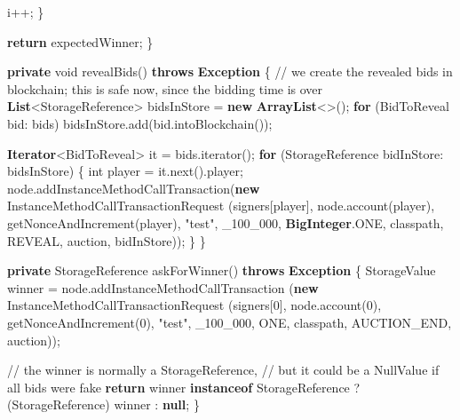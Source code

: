 \documentclass[a4paper,]{book}
\newenvironment{Shaded}{\begin{snugshade}}{\end{snugshade}}
\newcommand{\BuiltInTok}[1]{\textcolor[rgb]{0.39,0.29,0.61}{\textbf{#1}}}
\newcommand{\CommentTok}[1]{\textcolor[rgb]{0.54,0.53,0.53}{#1}}
\newcommand{\DataTypeTok}[1]{\textcolor[rgb]{0.00,0.34,0.68}{#1}}
\newcommand{\DecValTok}[1]{\textcolor[rgb]{0.69,0.50,0.00}{#1}}
\newcommand{\FunctionTok}[1]{\textcolor[rgb]{0.39,0.29,0.61}{#1}}
\newcommand{\KeywordTok}[1]{\textcolor[rgb]{0.12,0.11,0.11}{\textbf{#1}}}
\newcommand{\NormalTok}[1]{\textcolor[rgb]{0.12,0.11,0.11}{#1}}
\newcommand{\StringTok}[1]{\textcolor[rgb]{0.75,0.01,0.01}{#1}}
\renewenvironment{Shaded}{\begin{snugshade}\small}{\end{snugshade}}
\begin{document}
{\begin{Shaded}
\begin{Highlighting}[]
\NormalTok{      i++;}
\NormalTok{    \}}

    \KeywordTok{return}\NormalTok{ expectedWinner;}
\NormalTok{  \}}

  \KeywordTok{private} \DataTypeTok{void} \FunctionTok{revealBids}\NormalTok{() }\KeywordTok{throws} \BuiltInTok{Exception}\NormalTok{ \{}
    \CommentTok{// we create the revealed bids in blockchain; this is safe now, since the bidding time is over}
    \BuiltInTok{List}\NormalTok{<StorageReference> bidsInStore = }\KeywordTok{new} \BuiltInTok{ArrayList}\NormalTok{<>();}
    \KeywordTok{for}\NormalTok{ (BidToReveal bid: bids)}
\NormalTok{      bidsInStore.}\FunctionTok{add}\NormalTok{(bid.}\FunctionTok{intoBlockchain}\NormalTok{());}

    \BuiltInTok{Iterator}\NormalTok{<BidToReveal> it = bids.}\FunctionTok{iterator}\NormalTok{();}
    \KeywordTok{for}\NormalTok{ (StorageReference bidInStore: bidsInStore) \{}
      \DataTypeTok{int}\NormalTok{ player = it.}\FunctionTok{next}\NormalTok{().}\FunctionTok{player}\NormalTok{;}
\NormalTok{      node.}\FunctionTok{addInstanceMethodCallTransaction}\NormalTok{(}\KeywordTok{new}\NormalTok{ InstanceMethodCallTransactionRequest}
\NormalTok{        (signers[player], node.}\FunctionTok{account}\NormalTok{(player),}
        \FunctionTok{getNonceAndIncrement}\NormalTok{(player), }\StringTok{"test"}\NormalTok{, _}\DecValTok{100_000}\NormalTok{, }\BuiltInTok{BigInteger}\NormalTok{.}\FunctionTok{ONE}\NormalTok{,}
\NormalTok{        classpath, REVEAL, auction, bidInStore));}
\NormalTok{    \}}
\NormalTok{  \}}

  \KeywordTok{private}\NormalTok{ StorageReference }\FunctionTok{askForWinner}\NormalTok{() }\KeywordTok{throws} \BuiltInTok{Exception}\NormalTok{ \{}
\NormalTok{    StorageValue winner = node.}\FunctionTok{addInstanceMethodCallTransaction}
\NormalTok{      (}\KeywordTok{new}\NormalTok{ InstanceMethodCallTransactionRequest}
\NormalTok{      (signers[}\DecValTok{0}\NormalTok{], node.}\FunctionTok{account}\NormalTok{(}\DecValTok{0}\NormalTok{), }\FunctionTok{getNonceAndIncrement}\NormalTok{(}\DecValTok{0}\NormalTok{),}
      \StringTok{"test"}\NormalTok{, _}\DecValTok{100_000}\NormalTok{, ONE, classpath, AUCTION_END, auction));}

    \CommentTok{// the winner is normally a StorageReference,}
    \CommentTok{// but it could be a NullValue if all bids were fake}
    \KeywordTok{return}\NormalTok{ winner }\KeywordTok{instanceof}\NormalTok{ StorageReference ? (StorageReference) winner : }\KeywordTok{null}\NormalTok{;}
\NormalTok{  \}}


\end{Highlighting}
\end{Shaded}}
\end{document}
